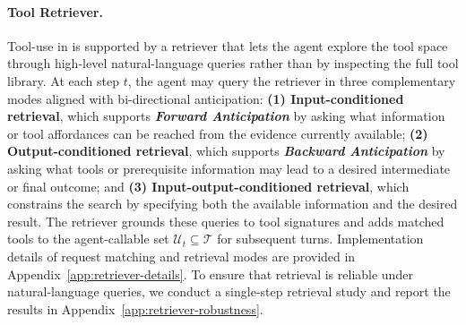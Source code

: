\paragraph{Tool Retriever.}

Tool-use in \bench{} is supported by a retriever that lets the agent explore the tool space through high-level natural-language queries rather than by inspecting the full tool library. 
At each step $t$, the agent may query the retriever in three complementary modes aligned with bi-directional anticipation:
\textbf{(1) Input-conditioned retrieval}, which supports \textbf{\textit{Forward Anticipation}} by asking what information or tool affordances can be reached from the evidence currently available;
\textbf{(2) Output-conditioned retrieval}, which supports \textbf{\textit{Backward Anticipation}} by asking what tools or prerequisite information may lead to a desired intermediate or final outcome;
and \textbf{(3) Input-output-conditioned retrieval}, which constrains the search by specifying both the available information and the desired result. 
The retriever grounds these queries to tool signatures and adds matched tools to the agent-callable set \(\mathcal{U}_t \subseteq \mathcal{T}\) for subsequent turns.
Implementation details of request matching and retrieval modes are provided in Appendix~\ref{app:retriever-details}.
To ensure that retrieval is reliable under natural-language queries, we conduct a single-step retrieval study and report the results in Appendix~\ref{app:retriever-robustness}.




